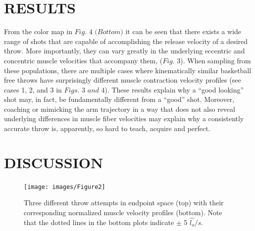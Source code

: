 \documentclass[12pt]{article}
\begin{document}
\begin{multicols}{2}
\section*{\normalsize RESULTS}
From the color map in $\textit{Fig. 4 (Bottom)}$ it can be seen that there exists a wide range of shots that are capable of accomplishing the release velocity of a desired throw. More importantly, they can vary greatly in the underlying eccentric and concentric muscle velocities that accompany them, ($\textit{Fig. 3}$). When sampling from these populations, there are multiple cases where kinematically similar basketball free throws have surprisingly different muscle contraction velocity profiles (see cases 1, 2, and 3 in $\textit{Figs. 3 and 4}$). These results explain why a “good looking” shot may, in fact, be fundamentally different from a “good” shot. Moreover, coaching or mimicking the arm trajectory in a way that does not also reveal underlying differences in muscle fiber velocities may explain why a consistently accurate throw is, apparently, so hard to teach, acquire and perfect.
\section*{\normalsize DISCUSSION}
 
\end{multicols}
\begin{figure}[H]
\centering
\texttt{[image: images/Figure2]}
\caption{Three different throw attempts in endpoint space (top) with their corresponding normalized muscle velocity profiles (bottom). Note that the dotted lines in the bottom plots indicate $\pm$ 5  $\hat{l_{o}}/s$.}\label{Figure3}
\end{figure}
\end{document}
